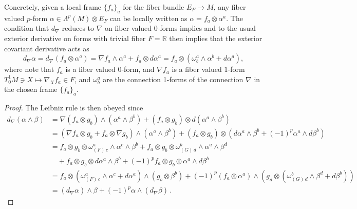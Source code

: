 \begin{mytheorem}
Concretely, given a local frame $\{f_a\}_a$ for the fiber bundle $E_F \to M$, any fiber valued $p$-form $\alpha \in \Lambda^p (M) \otimes E_F$ can be locally written as $\alpha = f_a\otimes \alpha^a$.
The condition that $d_\nabla$ reduces to $\nabla$ on fiber valued $0$-forms implies and to the usual exterior derivative on forms with trivial fiber $F = \mathbb{R}$ then implies that the exterior covariant derivative acts as
\begin{equation}
    d_\nabla \alpha = d_\nabla ( f_a\otimes \alpha^a)= \nabla f_a \wedge \alpha^a + f_a \otimes d \alpha^a  
    = f_a\otimes\left( \omega^a_{b} \wedge \alpha^b + d \alpha^a \right),
\end{equation}
where note that $f_a$ is a fiber valued $0$-form, and $\nabla f_a$ is a fiber valued $1$-form $T^1_0M\ni X \mapsto \nabla_X f_a \in F$, and $\omega^a_{b}$ are the connection 1-forms of the connection $\nabla$ in the chosen frame $\{f_a\}_a$.
\smallskip
\begin{proof}
The Leibniz rule is then obeyed since
\begin{align}
    d_\nabla(\alpha \wedge \beta) 
    &= \nabla (f_a\otimes g_b) \wedge (\alpha^a \wedge \beta^b) + (f_a\otimes g_b) \otimes d(\alpha^a \wedge \beta^b) \\
    &= \left( \nabla f_a \otimes g_b + f_a \otimes \nabla g_b \right) \wedge (\alpha^a \wedge \beta^b) +
    (f_a\otimes g_b) \otimes \left( d \alpha^a \wedge \beta^b + (-1)^p \alpha^a \wedge d \beta^b \right)
    \\
    &= f_a \otimes g_b \otimes \omega^a_{(F)\,c} \wedge \alpha^c \wedge \beta^b + f_a \otimes g_b \otimes \omega^b_{(G)\,d} \wedge \alpha^a \wedge \beta^d \\
    &\quad + f_a \otimes g_b \otimes d \alpha^a \wedge \beta^b + (-1)^p f_a \otimes g_b \otimes \alpha^a \wedge d \beta^b
    \\
    &= f_a\otimes\left( \omega^a_{(F)\,c} \wedge \alpha^c + d \alpha^a \right) \wedge (g_b \otimes \beta^b) + (-1)^p (f_a \otimes \alpha^a) \wedge \left( g_d \otimes \left( \omega^b_{(G)\,d} \wedge \beta^d + d \beta^b \right) \right)\\
    &=(d_\nabla \alpha) \wedge \beta + (-1)^p \alpha \wedge (d_\nabla \beta)\,.
\end{align}
\end{proof}
\end{mytheorem}






